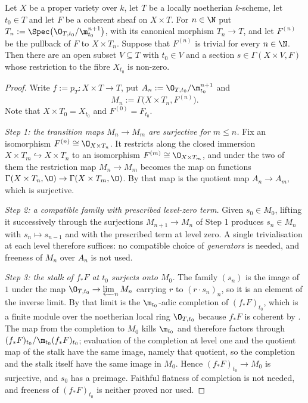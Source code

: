 \begin{lemma}
\label{lem:cube-formal-section-near-point}
Let $X$ be a proper variety over $k$, let $T$ be a locally noetherian
$k$-scheme, let $t_0\in T$ and let $F$ be a coherent sheaf on $X\times T$.  For
$n\in\N$ put $T_n:=\Spec\bigl(\O_{T,t_0}/\m_{t_0}^{n+1}\bigr)$, with its
canonical morphism $T_n\to T$, and let $F^{(n)}$ be the pullback of $F$ to
$X\times T_n$.  Suppose that $F^{(n)}$ is trivial for every $n\in\N$.  Then
there are an open subset $V\subseteq T$ with $t_0\in V$ and a section
$s\in\Gamma(X\times V,F)$ whose restriction to the fibre $X_{t_0}$ is non-zero.
\end{lemma}
\begin{proof}
Write $f:=p_T\colon X\times T\to T$, put $A_n:=\O_{T,t_0}/\m_{t_0}^{n+1}$ and
\[
  M_n:=\Gamma\bigl(X\times T_n,F^{(n)}\bigr).
\]
Note that $X\times T_0=X_{t_0}$ and $F^{(0)}=F_{t_0}$.

\emph{Step 1: the transition maps $M_n\to M_m$ are surjective for $m\leq n$.}
Fix an isomorphism $F^{(n)}\cong\O_{X\times T_n}$.  It restricts along the
closed immersion $X\times T_m\hookrightarrow X\times T_n$ to an isomorphism
$F^{(m)}\cong\O_{X\times T_m}$, and under the two of them the restriction map
$M_n\to M_m$ becomes the map on functions
$\Gamma(X\times T_n,\O)\to\Gamma(X\times T_m,\O)$.  By
 that map is the quotient map
$A_n\to A_m$, which is surjective.

\emph{Step 2: a compatible family with prescribed level-zero term.}  Given
$s_0\in M_0$, lifting it successively through the surjections
$M_{n+1}\to M_n$ of Step 1 produces $s_n\in M_n$ with $s_n\mapsto s_{n-1}$ and
with the prescribed term at level zero.  A single trivialisation at each level
therefore suffices: no compatible choice of \emph{generators} is needed, and
freeness of $M_n$ over $A_n$ is not used.

\emph{Step 3: the stalk of $f_*F$ at $t_0$ surjects onto $M_0$.}  The family
$(s_n)$ is the image of $1$ under the map $\O_{T,t_0}\to\varprojlim_nM_n$
carrying $r$ to $(r\cdot s_n)_n$, so it is an element of the inverse limit.  By
 that limit is the $\m_{t_0}$-adic completion
of $(f_*F)_{t_0}$, which is a finite module over the noetherian local ring
$\O_{T,t_0}$ because $f_*F$ is coherent by
.  The map from the completion to
$M_0$ kills $\m_{t_0}$ and therefore factors through
$(f_*F)_{t_0}/\m_{t_0}(f_*F)_{t_0}$; evaluation of the completion at level one
and the quotient map of the stalk have the same image, namely that quotient, so
the completion and the stalk itself have the same image in $M_0$.  Hence
$(f_*F)_{t_0}\to M_0$ is surjective, and $s_0$ has a preimage.  Faithful
flatness of completion is not needed, and freeness of $(f_*F)_{t_0}$ is neither
proved nor used.


\end{proof}
